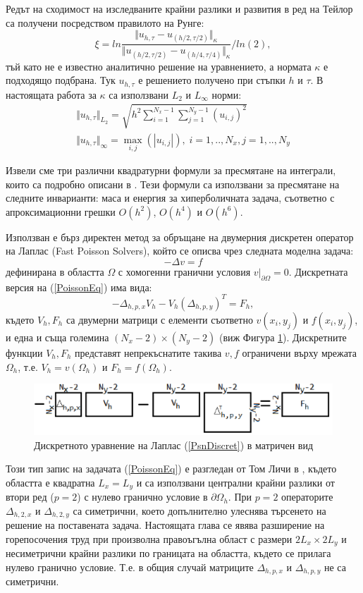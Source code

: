 \documentclass[a5paper]{article}
\newcommand{\be}{\begin{equation}}
\newcommand{\ee}{\end{equation}}
\newcommand{\rf}[1]{(\ref{#1})}
\theoremstyle{remark}
\begin{document}
\begin{large}
Редът на сходимост на изследваните крайни разлики и развития в ред на Тейлор са получени посредством правилото на Рунге:
\begin{equation}\label{Runge}
\xi = ln  \frac{\Vert u_{h,\tau} - u_{(h/2,\tau/2)} \Vert_\kappa } {\Vert  u_{(h/2,\tau/2)} - u_{(h/4,\tau/4)} \Vert_\kappa  } / ln(2),
\end{equation}
тъй като не е известно аналитично решение на уравнението, а нормата $\kappa$ е подходящо подбрана. Тук $u_{h,\tau}$ е решението получено при стъпки $h$ и $\tau$. В настоящата работа за $\kappa$ са използвани $L_2$ и $L_\infty$ норми:
\begin{align*}
\Vert u_{h,\tau} \Vert_{L_2} = \sqrt{ h^2 \sum_{i=1}^{N_x-1} \sum_{j=1}^{N_y-1}  (u_{i,j})^2 } \\
\Vert u_{h,\tau} \Vert_{\infty} = \max_{i,j}(|u_{i,j}|), \; i=1,..,N_x, j=1,..,N_y
\end{align*}

Извели сме три различни квадратурни формули за пресмятане на интеграли, които са подробно описани в \cite{refHyp}. Тези формули са използвани за пресмятане на следните инварианти: маса и енергия за хиперболичната задача, съответно с апроксимационни грешки $O(h^2)$, $O(h^4)$ и $O(h^6)$. 

Използван е бърз директен метод за обръщане на двумерния дискретен оператор на Лаплас (Fast Poisson Solvers), който се описва чрез следната моделна задача:
\be\label{PoissonEq}
-\Delta v = f
\ee
дефинирана в областта $\Omega$ с хомогенни гранични условия $v \big|_{\partial\Omega} = 0$. Дискретната версия на \rf{PoissonEq} има вида:
\be\label{PsnDiscret}
-\Delta_{h,p,x}  V_h - V_h (\Delta_{h,p,y})^T = F_h,
\ee
където $V_h, F_h$ са двумерни матрици с елементи съответно $v(x_i,y_j)$ и  $f(x_i,y_j)$, и една и съща големина $(N_x-2)\times(N_y-2)$ (виж Фигура \ref{fig:FPSexplained}). Дискретните функции $V_h, F_h$ представят непрекъснатите такива $v, f$ ограничени върху мрежата $\Omega_h$, т.е. $V_h = v(\Omega_h)$ и $F_h = f(\Omega_h)$.
\begin{figure}[ht]
     \includegraphics[width=\linewidth]{FPSExplained.png}
	\caption{Дискретното уравнение на Лаплас \rf{PsnDiscret} в матричен вид}
	\label{fig:FPSexplained}
\end{figure}
\FloatBarrier
Този тип запис на задачата \rf{PoissonEq} е разгледан от Том Личи в \cite{ref34}, където областта е квадратна $L_x = L_y$ и са използвани централни крайни разлики от втори ред ($p=2$) с нулево гранично условие в $\partial \Omega_h$. При $p=2$ операторите $\Delta_{h,2,x}$ и $\Delta_{h,2,y}$ са симетрични, което допълнително улеснява търсенето на решение на поставената задача. Настоящата глава се явява разширение на горепосочения труд при произволна правоъгълна област с размери $2L_x \times 2L_y$ и несиметрични крайни разлики по границата на областта, където се прилага нулево гранично условие. Т.е. в общия случай матриците $\Delta_{h,p,x}$ и $\Delta_{h,p,y}$ не са симетрични.


\end{large}
\end{document}
